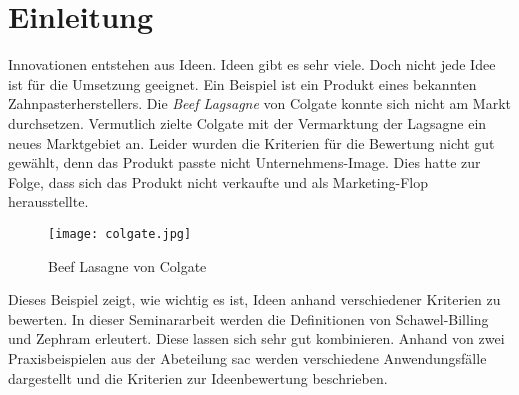 \section{Einleitung}\label{sec:einleitung}
Innovationen entstehen aus Ideen. Ideen gibt es sehr viele. Doch nicht jede Idee ist für die 
Umsetzung geeignet. Ein Beispiel ist ein Produkt eines bekannten Zahnpasterherstellers. 
Die \textit{Beef Lagsagne} von Colgate konnte sich nicht am Markt durchsetzen. 
Vermutlich zielte Colgate mit der Vermarktung der Lagsagne ein neues Marktgebiet an. 
Leider wurden die Kriterien für die Bewertung nicht gut gewählt, denn das Produkt passte nicht Unternehmens-Image.
Dies hatte zur Folge, dass sich das Produkt nicht verkaufte und als Marketing-Flop herausstellte.
\begin{figure}[ht]
	\centering
	\texttt{[image: colgate.jpg]}
	\caption{Beef Lasagne von Colgate}
	\label{img:colgate}
\end{figure}
Dieses Beispiel zeigt, wie wichtig es ist, Ideen anhand verschiedener Kriterien zu bewerten. 
In dieser Seminararbeit werden die Definitionen von Schawel-Billing und Zephram erleutert. Diese lassen sich sehr gut kombinieren. 
Anhand von zwei Praxisbeispielen aus der Abeteilung \ac{sac} werden verschiedene Anwendungsfälle dargestellt und die  
Kriterien zur Ideenbewertung beschrieben. 
